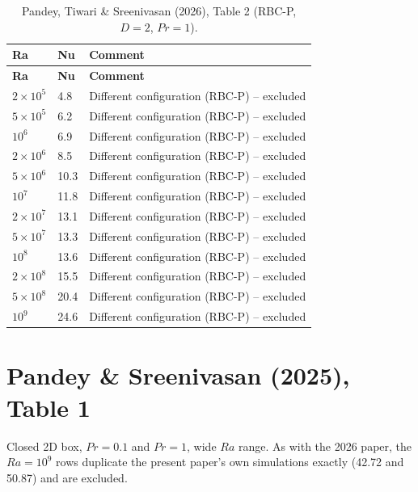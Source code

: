 \documentclass[11pt]{article}
\begin{document}
\begin{longtable}{l l l}
\caption{Pandey, Tiwari \& Sreenivasan (2026), Table 2 (RBC-P, $D=2$, $Pr=1$).}\label{tab:pandey2026t2}\\
\toprule
\textbf{Ra} & \textbf{Nu} & \textbf{Comment} \\
\midrule
\endfirsthead
\toprule
\textbf{Ra} & \textbf{Nu} & \textbf{Comment} \\
\midrule
\endhead
\bottomrule
\endfoot
\rowcolor{excluded} $2\times10^{5}$ & 4.8 & Different configuration (RBC-P) -- excluded \\
\rowcolor{excluded} $5\times10^{5}$ & 6.2 & Different configuration (RBC-P) -- excluded \\
\rowcolor{excluded} $10^{6}$ & 6.9 & Different configuration (RBC-P) -- excluded \\
\rowcolor{excluded} $2\times10^{6}$ & 8.5 & Different configuration (RBC-P) -- excluded \\
\rowcolor{excluded} $5\times10^{6}$ & 10.3 & Different configuration (RBC-P) -- excluded \\
\rowcolor{excluded} $10^{7}$ & 11.8 & Different configuration (RBC-P) -- excluded \\
\rowcolor{excluded} $2\times10^{7}$ & 13.1 & Different configuration (RBC-P) -- excluded \\
\rowcolor{excluded} $5\times10^{7}$ & 13.3 & Different configuration (RBC-P) -- excluded \\
\rowcolor{excluded} $10^{8}$ & 13.6 & Different configuration (RBC-P) -- excluded \\
\rowcolor{excluded} $2\times10^{8}$ & 15.5 & Different configuration (RBC-P) -- excluded \\
\rowcolor{excluded} $5\times10^{8}$ & 20.4 & Different configuration (RBC-P) -- excluded \\
\rowcolor{excluded} $10^{9}$ & 24.6 & Different configuration (RBC-P) -- excluded \\
\end{longtable}
\section{Pandey \& Sreenivasan (2025), Table 1}
Closed 2D box, $Pr=0.1$ and $Pr=1$, wide $Ra$ range. As with the 2026
paper, the $Ra=10^9$ rows duplicate the present paper's own simulations
exactly (42.72 and 50.87) and are excluded.
\end{document}
